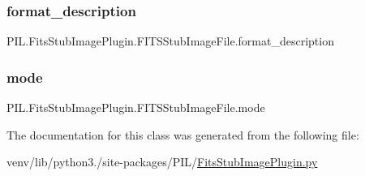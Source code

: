 \subsubsection{\texorpdfstring{format\+\_\+description}{format\_description}}
{\footnotesize\ttfamily P\+I\+L.\+Fits\+Stub\+Image\+Plugin.\+F\+I\+T\+S\+Stub\+Image\+File.\+format\+\_\+description\hspace{0.3cm}{\ttfamily [static]}}

\mbox{\label{classPIL_1_1FitsStubImagePlugin_1_1FITSStubImageFile_a88b610578f1dc007ce42dada76f3383c}} 
\subsubsection{\texorpdfstring{mode}{mode}}
{\footnotesize\ttfamily P\+I\+L.\+Fits\+Stub\+Image\+Plugin.\+F\+I\+T\+S\+Stub\+Image\+File.\+mode}



The documentation for this class was generated from the following file\+:\begin{DoxyCompactItemize}
\item 
venv/lib/python3./site-\/packages/\+P\+I\+L/\hyperlink{FitsStubImagePlugin_8py}{Fits\+Stub\+Image\+Plugin.\+py}\end{DoxyCompactItemize}
